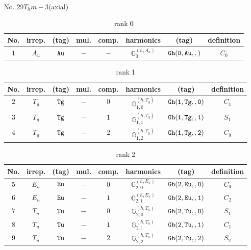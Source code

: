 \documentclass[fleqn,8pt]{jsarticle}
\begin{document}
\setcounter{MaxMatrixCols}{16}

\begin{center}
\LARGE
No. 29\quad$T_{h}$\quad$m-3$\quad[ cubic ] (axial)
\end{center}
\begin{table}[ht!]
\begin{center}
\caption{rank 0}
\renewcommand{\arraystretch}{1.3}
\begin{tabular}{cccccccc} \hline \hline
No. & irrep. & (tag) & mul. & comp. & harmonics & (tag) & definition \\ \hline
$ 1 $ & $ A_{u} $ & $ {\tt Au} $ & $ - $ & $ - $ & $ \mathbb{G}_{0}^{(h,A_{u})} $ & $ {\tt Gh(0,Au,,)} $ & $ C_{0} $ \\
 \hline \hline
\end{tabular}
\end{center}
\end{table}
\begin{table}[ht!]
\begin{center}
\caption{rank 1}
\renewcommand{\arraystretch}{1.3}
\begin{tabular}{cccccccc} \hline \hline
No. & irrep. & (tag) & mul. & comp. & harmonics & (tag) & definition \\ \hline
$ 2 $ & $ T_{g} $ & $ {\tt Tg} $ & $ - $ & $ 0 $ & $ \mathbb{G}_{1,0}^{(h,T_{g})} $ & $ {\tt Gh(1,Tg,,0)} $ & $ C_{1} $ \\
$ 3 $ & $ T_{g} $ & $ {\tt Tg} $ & $ - $ & $ 1 $ & $ \mathbb{G}_{1,1}^{(h,T_{g})} $ & $ {\tt Gh(1,Tg,,1)} $ & $ S_{1} $ \\
$ 4 $ & $ T_{g} $ & $ {\tt Tg} $ & $ - $ & $ 2 $ & $ \mathbb{G}_{1,2}^{(h,T_{g})} $ & $ {\tt Gh(1,Tg,,2)} $ & $ C_{0} $ \\
 \hline \hline
\end{tabular}
\end{center}
\end{table}
\begin{table}[ht!]
\begin{center}
\caption{rank 2}
\renewcommand{\arraystretch}{1.3}
\begin{tabular}{cccccccc} \hline \hline
No. & irrep. & (tag) & mul. & comp. & harmonics & (tag) & definition \\ \hline
$ 5 $ & $ E_{u} $ & $ {\tt Eu} $ & $ - $ & $ 0 $ & $ \mathbb{G}_{2,0}^{(h,E_{u})} $ & $ {\tt Gh(2,Eu,,0)} $ & $ C_{0} $ \\
$ 6 $ & $ E_{u} $ & $ {\tt Eu} $ & $ - $ & $ 1 $ & $ \mathbb{G}_{2,1}^{(h,E_{u})} $ & $ {\tt Gh(2,Eu,,1)} $ & $ C_{2} $ \\
$ 7 $ & $ T_{u} $ & $ {\tt Tu} $ & $ - $ & $ 0 $ & $ \mathbb{G}_{2,0}^{(h,T_{u})} $ & $ {\tt Gh(2,Tu,,0)} $ & $ S_{1} $ \\
$ 8 $ & $ T_{u} $ & $ {\tt Tu} $ & $ - $ & $ 1 $ & $ \mathbb{G}_{2,1}^{(h,T_{u})} $ & $ {\tt Gh(2,Tu,,1)} $ & $ C_{1} $ \\
$ 9 $ & $ T_{u} $ & $ {\tt Tu} $ & $ - $ & $ 2 $ & $ \mathbb{G}_{2,2}^{(h,T_{u})} $ & $ {\tt Gh(2,Tu,,2)} $ & $ S_{2} $ \\
 \hline \hline
\end{tabular}
\end{center}
\end{table}
\end{document}
